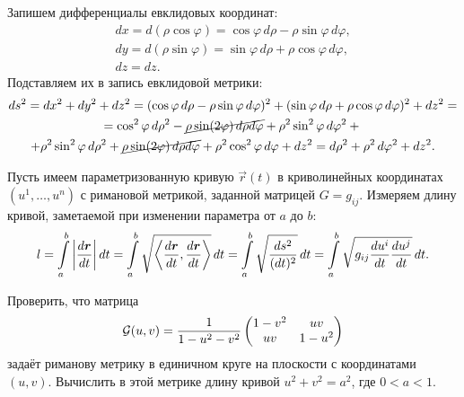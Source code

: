 \begin{solution}
	Запишем дифференциалы евклидовых координат:
	\begin{gather*}
		dx = d(\rho\cos\varphi) = \cos\varphi\,d\rho - \rho\sin\varphi\,d\varphi,\\
		dy = d(\rho\sin\varphi) = \sin\varphi\,d\rho + \rho\cos\varphi\,d\varphi,\\
		dz = dz.
	\end{gather*}
	Подставляем их в запись евклидовой метрики:
	\begin{multline*}
		ds^2 = dx^2 + dy^2 + dz^2 = (\cos\varphi\,d\rho - \rho\sin\varphi\,d\varphi)^2 + (\sin\varphi\,d\rho + \rho\cos\varphi\,d\varphi)^2 + dz^2 =\\ = \cos^2\varphi\,d\rho^2 - \cancel{\rho\sin(2\varphi)\,d\rho d\varphi} + \rho^2\sin^2\varphi\,d\varphi^2 + {}\\ + \rho^2\sin^2\varphi\,d\rho^2 + \cancel{\rho\sin(2\varphi)\,d\rho d\varphi} + \rho^2\cos^2\varphi\,d\varphi + dz^2 = d\rho^2 + \rho^2\,d\varphi^2 + dz^2.
	\end{multline*}
\end{solution}

Пусть имеем параметризованную кривую $\vec{r}(t)$ в криволинейных координатах $(u^1, \ldots, u^n)$ с римановой метрикой, заданной матрицей $G = g_{ij}$. Измеряем длину кривой, заметаемой при изменении параметра от $a$ до $b$:
\begin{equation} \label{eq:RiemannLength}
	l = \int\limits_a^b\left\lvert\frac{d\boldsymbol{r}}{dt}\right\rvert dt = \int\limits_a^b\sqrt{\left\langle \frac{d\boldsymbol{r}}{dt}, \frac{d\boldsymbol{r}}{dt} \right\rangle}\,dt = \int\limits_a^b\sqrt{\frac{ds^2}{(dt)^2}}\,dt = \int\limits_a^b\sqrt{g_{ij}\frac{du^i}{dt}\frac{du^j}{dt}}\,dt.
\end{equation}

\begin{problem}
	Проверить, что матрица
	\[
		\mathcal{G}(u, v) = \frac{1}{1 - u^2 - v^2}
		\begin{pmatrix}
			1 - v^2 & uv\\
			uv & 1 - u^2
		\end{pmatrix}
	\]
	задаёт риманову метрику в единичном круге на плоскости с координатами $(u, v)$. Вычислить в этой метрике длину кривой $u^2 + v^2 = a^2$, где $0 < a < 1$.
\end{problem}

